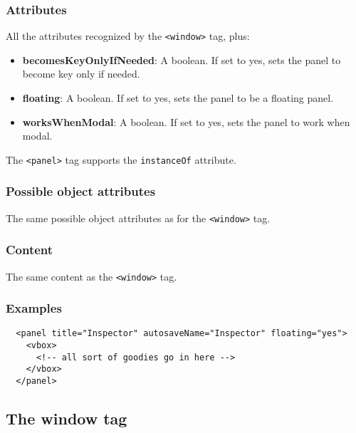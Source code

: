 \subsubsection{Attributes}
All the attributes recognized by the \texttt{<window>} tag, plus:
\begin{itemize}
\item {\bf becomesKeyOnlyIfNeeded}: A boolean.  If set to yes, sets the panel
to become key only if needed.
\item {\bf floating}: A boolean.  If set to yes, sets the panel
to be a floating panel.
\item {\bf worksWhenModal}: A boolean.  If set to yes, sets the panel
to work when modal.
\end{itemize}

The \texttt{<panel>} tag supports the \texttt{instanceOf} attribute.

\subsubsection{Possible object attributes}
The same possible object attributes as for the \texttt{<window>} tag.

\subsubsection{Content}
The same content as the \texttt{<window>} tag.

\subsubsection{Examples}
\begin{verbatim}
  <panel title="Inspector" autosaveName="Inspector" floating="yes">
    <vbox>
      <!-- all sort of goodies go in here -->
    </vbox>
  </panel>
\end{verbatim}

\subsection{The window tag}

